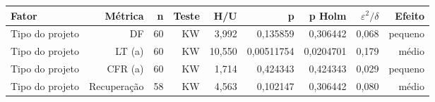 {\footnotesize
\begin{tabular}{lrrrrrrrr}
\hline
Fator & Métrica & n & Teste & H/U & p & p Holm & $\varepsilon^2/\delta$ & Efeito \\
\hline
Tipo do projeto & DF & 60 & KW & 3,992 & 0,135859 & 0,306442 & 0,068 & pequeno \\
Tipo do projeto & LT (a) & 60 & KW & 10,550 & 0,00511754 & 0,0204701 & 0,179 & médio \\
Tipo do projeto & CFR (a) & 60 & KW & 1,714 & 0,424343 & 0,424343 & 0,029 & pequeno \\
Tipo do projeto & Recuperação & 58 & KW & 4,563 & 0,102147 & 0,306442 & 0,080 & médio \\
\hline
\end{tabular}
}

